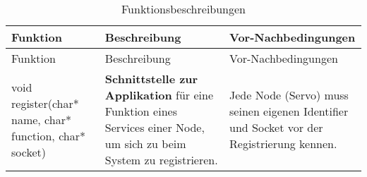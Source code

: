 \begin{longtable}{|>{\raggedright\arraybackslash}p{4cm}|>{\raggedright\arraybackslash}p{5cm}|>{\raggedright\arraybackslash}p{5cm}|}
	\caption{Funktionsbeschreibungen} \label{tab:loesungsstrategie} \\
	\hline
	Funktion & Beschreibung & Vor-Nachbedingungen \\
	\hline
	\endfirsthead
	
	\hline
	Funktion & Beschreibung & Vor-Nachbedingungen \\
	\hline
	\endhead
	
	\hline
	\endfoot
	
	
	void register(char* name, char* function, char* socket) & 
	\textbf{Schnittstelle zur Applikation} für eine Funktion eines Services einer Node, um sich zu beim System zu registrieren. 
	& Jede Node (Servo) muss seinen eigenen Identifier und Socket vor der Registrierung kennen. 
	\\
	\hline
	

\end{longtable}
